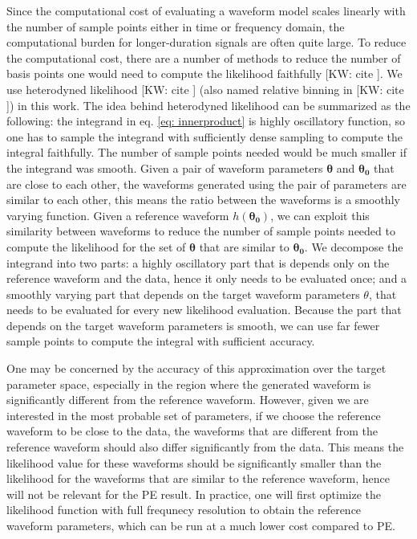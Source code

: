 \documentclass[twocolumn]{aastex631}
\newcommand{\kw}[1]{{\color{rb4}[KW: #1 ]}}
\begin{document}
Since the computational cost of evaluating a waveform model scales linearly with
the number of sample points either in time or frequency domain, the
computational burden for longer-duration signals are often quite large. To
reduce the computational cost, there are a number of methods to reduce the
number of basis points one would need to compute the likelihood faithfully
\kw{cite}. We use heterodyned likelihood \kw{cite} (also named relative binning
in \kw{cite}) in this work. The idea behind heterodyned likelihood can be
summarized as the following: the integrand in eq. \ref{eq: innerproduct} is
highly oscillatory function, so one has to sample the integrand with
sufficiently dense sampling to compute the integral faithfully. The number of
sample points needed would be much smaller if the integrand was smooth. Given a
pair of waveform parameters $\mathbf{\theta}$ and $\mathbf{\theta_0}$ that are
close to each other, the waveforms generated using the pair of parameters are
similar to each other, this means the ratio between the waveforms is a smoothly
varying function. Given a reference waveform $h(\mathbf{\theta_0})$, we can
exploit this similarity between waveforms to reduce the number of sample points
needed to compute the likelihood for the set of $\mathbf{\theta}$ that are
similar to $\mathbf{\theta_0}$. We decompose the integrand into two parts: a
highly oscillatory part that is depends only on the reference waveform and the
data, hence it only needs to be evaluated once; and a smoothly varying part that
depends on the target waveform parameters $\theta$, that needs to be evaluated
for every new likelihood evaluation. Because the part that depends on the target
waveform parameters is smooth, we can use far fewer sample points to compute the
integral with sufficient accuracy.

One may be concerned by the accuracy of this approximation over the target
parameter space, especially in the region where the generated waveform is
significantly different from the reference waveform. However, given we are
interested in the most probable set of parameters, if we choose the reference
waveform to be close to the data, the waveforms that are different from the
reference waveform should also differ significantly from the data. This means
the likelihood value for these waveforms should be significantly smaller than
the likelihood for the waveforms that are similar to the reference waveform,
hence will not be relevant for the PE result. In practice, one will first
optimize the likelihood function with full frequnecy resolution to obtain the
reference waveform parameters, which can be run at a much lower cost compared to
PE.
\end{document}
